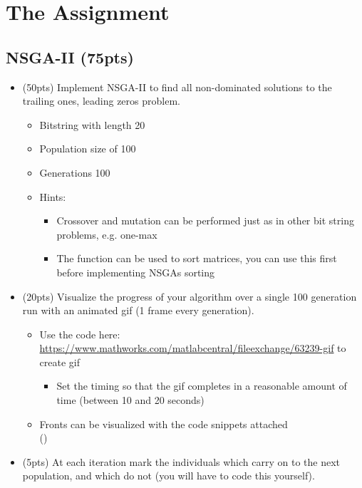\documentclass[11pt, a4paper]{article}
\begin{document}
\newpage
\section{The Assignment}

\subsection{NSGA-II (75pts)}
\begin{itemize}
	\item (50pts) Implement NSGA-II to find all non-dominated solutions to the trailing ones, leading zeros problem.
	\begin{itemize}
		\item Bitstring with length 20
		\item Population size of 100
		\item Generations 100
		\item Hints:
		\begin{itemize}
			\item Crossover and mutation can be performed just as in other bit string problems, e.g. one-max
			\item The  function can be used to sort matrices, you can use this first before implementing NSGAs sorting
		\end{itemize}
	\end{itemize}
	\item (20pts) Visualize the progress of your algorithm over a single 100 generation run with an animated gif (1 frame every generation).
	\begin{itemize}
		\item Use the code here: \url{https://www.mathworks.com/matlabcentral/fileexchange/63239-gif} to create gif
		\begin{itemize}
			\item Set the timing so that the gif completes in a reasonable amount of time (between 10 and 20 seconds)
		\end{itemize}
		\item Fronts can be visualized with the code snippets attached\\ ()
	\end{itemize}
	\item (5pts) At each iteration mark the individuals which carry on to the next population, and which do not (you will have to code this yourself).
\end{itemize}

\newpage
\end{document}
